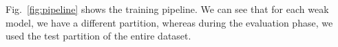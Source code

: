 Fig.~\ref{fig:pipeline} shows the training pipeline. We can see that for each weak model, we have a different partition, whereas during the evaluation phase, we used the test partition of the entire dataset.






  



